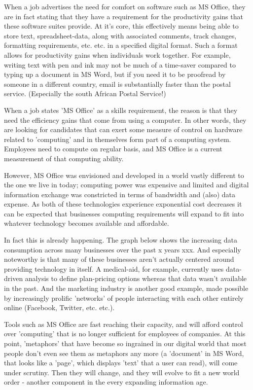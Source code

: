 When a job advertises the need for comfort on software such as MS Office, they are in fact stating that they have a requirement for the productivity gains that these software suites provide. At it's core, this effectively means being able to store text, spreadsheet-data, along with associated comments, track changes, formatting requirements, etc. etc. in a specified digital format. Such a format allows for productivity gains when individuals work together. For example, writing text with pen and ink may not be much of a time-saver compared to typing up a document in MS Word, but if you need it to be proofread by someone in a different country, email is substantially faster than the postal service. (Especially the south African Postal Service!)

When a job states 'MS Office' as a skills requirement, the reason is that they need the efficiency gains that come from using a computer. In other words, they are looking for candidates that can exert some measure of control on hardware related to 'computing' and in themselves form part of a computing system. Employees need to compute on regular basis, and MS Office is a current measurement of that computing ability.

However, MS Office was envisioned and developed in a world vastly different to the one we live in today; computing power was expensive and limited and digital information exchange was constricted in terms of bandwidth and (also) data expense. As both of these technologies experience exponential cost decreases it can be expected that businesses computing requirements will expand to fit into whatever technology becomes available and affordable.

In fact this is already happening. The graph below shows the increasing data consumption across many businesses over the past x years xxx. And especially noteworthy is that many of these businesses aren't actually centered around providing technology in itself. A medical-aid, for example, currently uses data-driven analysis to define plan-pricing options whereas that data wasn't available in the past. And the marketing industry is another good example, made possible by increasingly prolific 'networks' of people interacting with each other entirely online (Facebook, Twitter, etc. etc.).

Tools such as MS Office are fast reaching their capacity, and will afford control over 'computing' that is no longer sufficient for employees of companies. At this point, 'metaphors' that have become so ingrained in our digital world that most people don't even see them as metaphors any more (a 'document' in MS Word, that looks like a 'page', which displays 'text' that a user can read), will come under scrutiny. Then they will change, and they will evolve to fit a new world order - another component in the every expanding information age.

